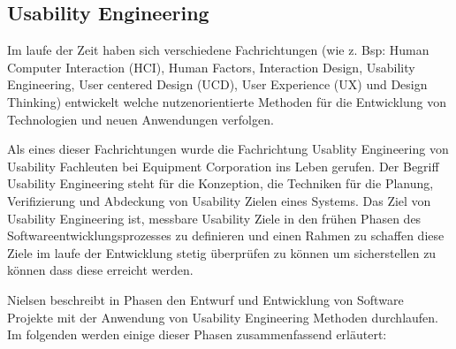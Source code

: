 \subsection{Usability Engineering}

\cite[S.~7]{MichaelRichter2016} Im laufe der Zeit haben sich verschiedene Fachrichtungen (wie z. Bsp: Human Computer Interaction (HCI), Human Factors, Interaction Design, Usability Engineering, 
User centered Design (UCD), User Experience (UX) und Design Thinking) entwickelt welche nutzenorientierte Methoden für die Entwicklung von Technologien und neuen Anwendungen verfolgen. 

\cite[S.~14]{MaryBethRossonJohnM.CarrollDianeD.Cerra2002} Als eines dieser Fachrichtungen wurde die Fachrichtung Usablity Engineering von Usability Fachleuten bei Equipment Corporation ins Leben gerufen.  
Der Begriff Usability Engineering steht für die Konzeption, die Techniken für die Planung, Verifizierung und Abdeckung von Usability Zielen eines Systems. Das Ziel von Usability Engineering ist, 
messbare Usability Ziele in den frühen Phasen des Softwareentwicklungsprozesses zu definieren und einen Rahmen zu schaffen diese Ziele im laufe der Entwicklung stetig überprüfen zu können 
um sicherstellen zu können dass diese erreicht werden.

Nielsen beschreibt in \cite[S.~72]{Nielsen1994} Phasen den Entwurf und Entwicklung von Software Projekte mit der Anwendung von Usability Engineering Methoden durchlaufen. 
Im folgenden werden einige dieser Phasen zusammenfassend erläutert: 

